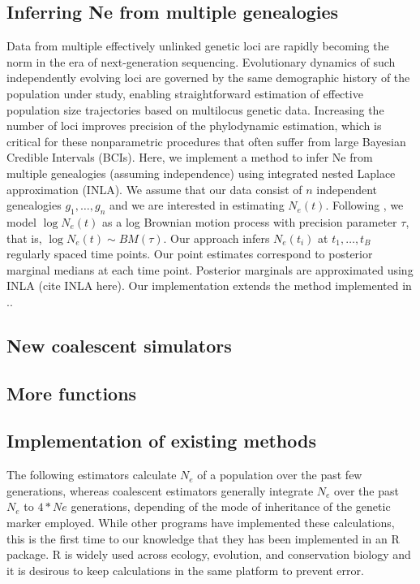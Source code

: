 \documentclass[english,titlepage]{article}
\begin{document}
\subsection*{Inferring Ne from multiple genealogies} 
Data from multiple effectively unlinked genetic loci are rapidly becoming the norm in the era of next-generation sequencing. Evolutionary dynamics of such independently evolving loci are governed by the same demographic history of the population under study, enabling straightforward estimation of effective
population size trajectories based on multilocus genetic data. Increasing the number of loci improves precision of the phylodynamic estimation, which is critical for these nonparametric procedures that often suffer from large Bayesian Credible Intervals (BCIs). Here, we implement a method to infer Ne from multiple genealogies (assuming independence) using integrated nested Laplace approximation (INLA). We assume that our data consist of $n$ independent genealogies $g_{1},\ldots,g_{n}$ and we are interested in estimating $N_{e}(t)$. Following \citet{palacios2012INLA}, we model $\log N_{e}(t)$ as a log Brownian motion process with precision parameter $\tau$, that is, $\log N_{e}(t) \sim BM(\tau)$. Our approach infers $N_{e}(t_{i})$ at $t_{1},\ldots,t_{B}$ regularly spaced time points. Our point estimates correspond to posterior marginal medians at each time point. Posterior marginals are approximated using INLA (cite INLA here). Our implementation extends the method implemented in ..

\subsection*{New coalescent simulators}
\citep{Palacios2013}

\subsection*{More functions}
\citep{Hein2005}


\subsection*{Implementation of existing methods}

The following estimators calculate $N_e$ of a population over the past few generations, whereas coalescent estimators generally integrate $N_e$ over the past $N_e$ to $4*Ne$ generations, depending of the mode of inheritance of the genetic marker employed. While other programs have implemented these calculations, this is the first time to our knowledge that they has been implemented in an R package. R is widely used across ecology, evolution, and conservation biology and it is desirous to keep calculations in the same platform to prevent error.
\end{document}
